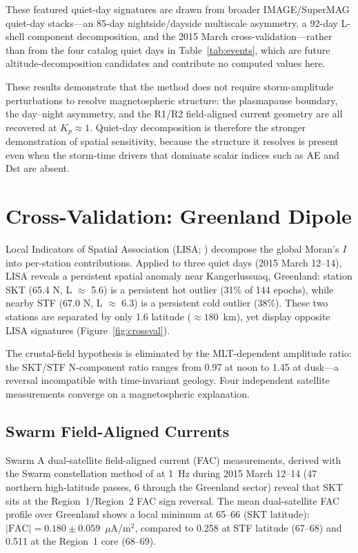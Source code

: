 \documentclass[11pt,letterpaper]{article}
\begin{document}
These featured quiet-day signatures are drawn from broader IMAGE/SuperMAG
quiet-day stacks---an 85-day nightside/dayside multiscale asymmetry, a 92-day
L-shell component decomposition, and the 2015 March cross-validation---rather
than from the four catalog quiet days in Table~\ref{tab:events}, which are
future altitude-decomposition candidates and contribute no computed values here.

These results demonstrate that the method does not require storm-amplitude
perturbations to resolve magnetospheric structure: the plasmapause boundary, the
day--night asymmetry, and the R1/R2 field-aligned current geometry are all
recovered at $K_p \approx 1$. Quiet-day decomposition is therefore the stronger
demonstration of spatial sensitivity, because the structure it resolves is
present even when the storm-time drivers that dominate scalar indices such as
AE and Dst are absent.

\section{Cross-Validation: Greenland Dipole}
\label{sec:crossval}

Local Indicators of Spatial Association (LISA; \citealt{anselin1995lisa})
decompose the global Moran's $I$ into per-station contributions. Applied to
three quiet days (2015 March 12--14), LISA reveals a persistent spatial anomaly
near Kangerlussuaq, Greenland: station SKT (65.4\textdegree{} N, L $\approx$ 5.6)
is a persistent hot outlier (31\% of 144 epochs), while nearby STF
(67.0\textdegree{} N, L $\approx$ 6.3) is a persistent cold outlier (38\%).
These two stations are separated by only 1.6\textdegree{}{} latitude
($\approx 180$~km), yet display opposite LISA signatures
(Figure~\ref{fig:crossval}).

The crustal-field hypothesis is eliminated by the MLT-dependent amplitude ratio:
the SKT/STF N-component ratio ranges from 0.97 at noon to 1.45 at dusk---a
reversal incompatible with time-invariant geology. Four independent satellite
measurements converge on a magnetospheric explanation.

\subsection{Swarm Field-Aligned Currents}
\label{sec:swarm_fac}

Swarm A dual-satellite field-aligned current (FAC) measurements, derived with the
Swarm constellation method of \citet{ritter2013swarm}
at 1~Hz during 2015 March 12--14 (47 northern high-latitude
passes, 6 through the Greenland sector) reveal that SKT sits at the
Region~1/Region~2 FAC sign reversal. The mean dual-satellite FAC profile over
Greenland shows a local minimum at 65--66\textdegree{}{} (SKT latitude):
$|\mathrm{FAC}| = 0.180 \pm 0.059$~$\mu$A/m$^2$, compared to 0.258 at STF
latitude (67--68\textdegree{}) and 0.511 at the Region~1 core (68--69\textdegree{}).
\end{document}

